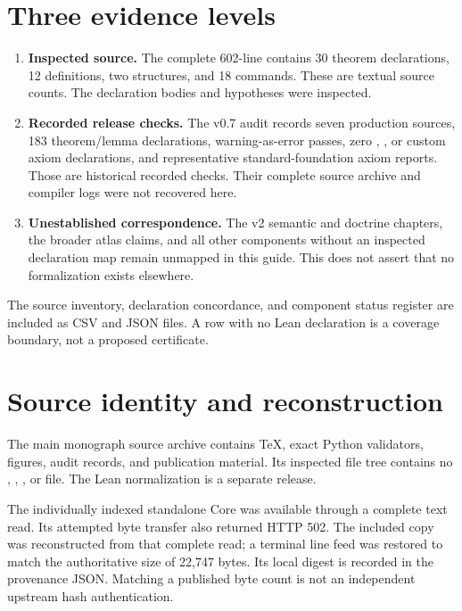 \documentclass[11pt]{article}
\begin{document}
\section{Three evidence levels}
\begin{enumerate}
\item \textbf{Inspected source.} The complete 602-line
\texttt{} contains 30 theorem declarations,
12 definitions, two structures, and 18 \texttt{} commands. These are
textual source counts. The declaration bodies and hypotheses were inspected.
\item \textbf{Recorded release checks.} The v0.7 audit records seven production
sources, 183 theorem/lemma declarations, warning-as-error passes, zero
\texttt{}, \texttt{}, or custom axiom declarations, and representative
standard-foundation axiom reports. Those are historical recorded checks.
Their complete source archive and compiler logs were not recovered here.
\item \textbf{Unestablished correspondence.} The v2 semantic and doctrine
chapters, the broader atlas claims, and all other components without an
inspected declaration map remain unmapped in this guide. This does not
assert that no formalization exists elsewhere.
\end{enumerate}

The source inventory, declaration concordance, and component status register
are included as CSV and JSON files. A row with no Lean declaration is a
coverage boundary, not a proposed certificate.

\section{Source identity and reconstruction}
The main monograph source archive contains TeX, exact Python validators,
figures, audit records, and publication material. Its inspected file tree
contains no \texttt{}, \texttt{}, \texttt{}, or
\texttt{} file. The Lean normalization is a separate release.

The individually indexed standalone Core was available through a complete
text read. Its attempted byte transfer also returned HTTP 502. The included
copy was reconstructed from that complete read; a terminal line feed was
restored to match the authoritative size of 22,747 bytes. Its local digest
is recorded in the provenance JSON. Matching a published byte count is not
an independent upstream hash authentication.
\end{document}
